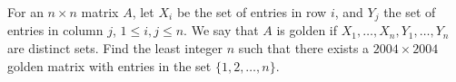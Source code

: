 For an $n \times n$ matrix $A$, let $X_i$ be the set of entries in row $i$, and $Y_j$ the set of entries in column $j$, $1 \leq i, j \leq n$. We say that $A$ is golden if $X_1, \ldots, X_n, Y_1, \ldots, Y_n$ are distinct sets. Find the least integer $n$ such that there exists a $2004 \times 2004$ golden matrix with entries in the set $\{1, 2, \ldots, n\}$.
